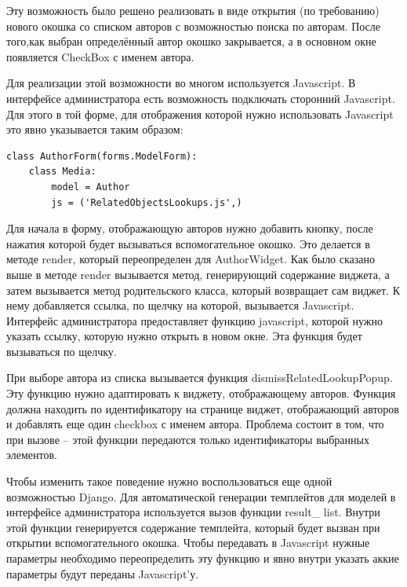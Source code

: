 \documentclass[a4paper]{report}
\begin{document}
Эту возможность было решено реализовать в виде открытия (по требованию) нового окошка со списком авторов с возможностью поиска по авторам. После того,как выбран определённый автор окошко закрывается, а в основном окне появляется CheckBox с именем автора. 

Для реализации этой возможности во многом используется Javascript. В интерфейсе администратора есть возможность подключать сторонний Javascript. Для этого в той форме, для отображения которой нужно использовать Javascript это явно указывается таким образом:

\begin{verbatim}
class AuthorForm(forms.ModelForm):
    class Media:
    	model = Author
        js = ('RelatedObjectsLookups.js',)

\end{verbatim}

Для начала в форму, отображающую авторов нужно добавить кнопку, после нажатия которой будет вызываться вспомогательное окошко. Это делается в методе render, который переопределен для AuthorWidget. Как было сказано выше в методе render вызывается метод, генерирующий содержание виджета, а затем вызывается метод родительского класса, который возвращает сам виджет. К нему добавляется ссылка, по щелчку на которой, вызывается Javascript. Интерфейс администратора предоставляет функцию javascript, которой нужно указать ссылку, которую нужно открыть в новом окне. Эта функция будет вызываться по щелчку. 

При выборе автора из списка вызывается функция dismissRelatedLookupPopup. Эту функцию нужно адаптировать к виджету, отображающему авторов. Функция должна находить по идентификатору на странице виджет, отображающий авторов и добавлять еще один checkbox с именем автора. Проблема состоит в том, что при вызове -- этой функции передаются только идентификаторы выбранных элементов. 

Чтобы изменить такое поведение нужно воспользоваться еще одной возможностью Django. Для автоматической генерации темплейтов для моделей в интерфейсе администратора используется вызов функции result\_ list. Внутри этой функции генерируется содержание темплейта, который будет вызван при открытии вспомогательного окошка. Чтобы передавать в Javascript нужные параметры необходимо переопределить эту функцию и явно внутри указать аккие параметры будут переданы Javascript'у.

 

\end{document}
